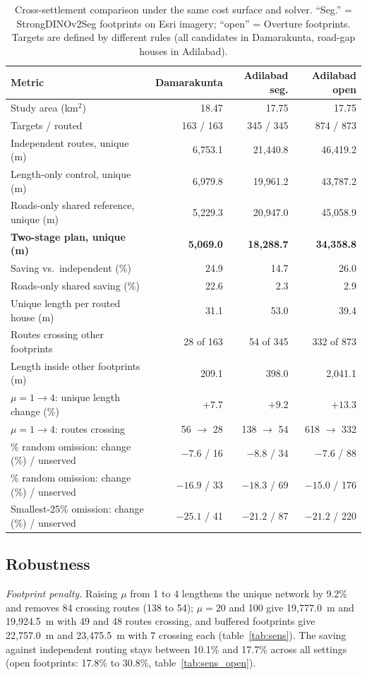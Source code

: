 \documentclass[12pt,a4paper]{article}
\newcommand{\dinoseg}{StrongDINOv2Seg}
\begin{document}
\begin{table}[t]
\caption{Cross-settlement comparison under the same cost surface and solver. ``Seg.'' = \dinoseg{} footprints on Esri imagery; ``open'' = Overture footprints. Targets are defined by different rules (all candidates in Damarakunta, road-gap houses in Adilabad).}
\label{tab:adilabad}
\centering
\footnotesize
\begin{tabular}{@{}>{\raggedright\arraybackslash}p{5.6cm}rrr@{}}
\toprule
Metric & Damarakunta & Adilabad seg. & Adilabad open\\
\midrule
Study area (km$^2$) & 18.47 & 17.75 & 17.75\\
Targets / routed & 163 / 163 & 345 / 345 & 874 / 873\\
Independent routes, unique (m) & 6{,}753.1 & 21{,}440.8 & 46{,}419.2\\
Length-only control, unique (m) & 6{,}979.8 & 19{,}961.2 & 43{,}787.2\\
Roads-only shared reference, unique (m) & 5{,}229.3 & 20{,}947.0 & 45{,}058.9\\
\textbf{Two-stage plan, unique (m)} & \textbf{5{,}069.0} & \textbf{18{,}288.7} & \textbf{34{,}358.8}\\
Saving vs.\ independent (\%) & 24.9 & 14.7 & 26.0\\
Roads-only shared saving (\%) & 22.6 & 2.3 & 2.9\\
Unique length per routed house (m) & 31.1 & 53.0 & 39.4\\
Routes crossing other footprints & 28 of 163 & 54 of 345 & 332 of 873\\
Length inside other footprints (m) & 209.1 & 398.0 & 2{,}041.1\\
$\mu=1\rightarrow4$: unique length change (\%) & $+7.7$ & $+9.2$ & $+13.3$\\
$\mu=1\rightarrow4$: routes crossing & 56 $\rightarrow$ 28 & 138 $\rightarrow$ 54 & 618 $\rightarrow$ 332\\
10\% random omission: change (\%) / unserved & $-7.6$ / 16 & $-8.8$ / 34 & $-7.6$ / 88\\
20\% random omission: change (\%) / unserved & $-16.9$ / 33 & $-18.3$ / 69 & $-15.0$ / 176\\
Smallest-25\% omission: change (\%) / unserved & $-25.1$ / 41 & $-21.2$ / 87 & $-21.2$ / 220\\
\bottomrule
\end{tabular}
\end{table}
\subsection{Robustness}
\emph{Footprint penalty.} Raising $\mu$ from 1 to 4 lengthens the unique network by 9.2\% and removes 84 crossing routes (138 to 54); $\mu=20$ and 100 give 19{,}777.0~m and 19{,}924.5~m with 49 and 48 routes crossing, and buffered footprints give 22{,}757.0~m and 23{,}475.5~m with 7 crossing each (table~\ref{tab:sens}). The saving against independent routing stays between 10.1\% and 17.7\% across all settings (open footprints: 17.8\% to 30.8\%, table~\ref{tab:sens_open}).
\end{document}
